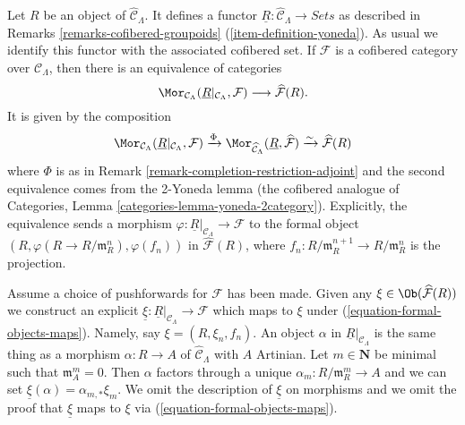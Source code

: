 \begin{remark}
\label{remark-formal-objects-yoneda}
Let $R$ be an object of $\widehat{\mathcal{C}}_\Lambda$.  It defines a functor
$\underline{R}: \widehat{\mathcal{C}}_\Lambda \to \textit{Sets}$
as described in
Remarks \ref{remarks-cofibered-groupoids} (\ref{item-definition-yoneda}).
As usual we identify this functor with the
associated cofibered set.  If $\mathcal{F}$ is a cofibered category over
$\mathcal{C}_\Lambda$, then there is an equivalence of categories
\begin{equation}
\label{equation-formal-objects-maps}
\Mor_{\mathcal{C}_\Lambda}(
\underline{R}|_{\mathcal{C}_\Lambda}, \mathcal{F})
\longrightarrow
\widehat{\mathcal{F}}(R).
\end{equation}
It is given by the composition
$$
\Mor_{\mathcal{C}_\Lambda}(
\underline{R}|_{\mathcal{C}_\Lambda}, \mathcal{F})
\xrightarrow{\Phi}
\Mor_{\widehat{\mathcal{C}}_\Lambda}(
\underline{R}, \widehat{\mathcal{F}})
\xrightarrow{\sim}
\widehat{\mathcal{F}}(R)
$$
where $\Phi$ is as in
Remark \ref{remark-completion-restriction-adjoint}
and the second equivalence comes from the 2-Yoneda lemma
(the cofibered analogue of
Categories, Lemma \ref{categories-lemma-yoneda-2category}).
Explicitly, the equivalence sends a morphism
$\varphi: \underline{R}|_{\mathcal{C}_\Lambda} \to \mathcal{F}$
to the formal object
$(R, \varphi(R \to R/\mathfrak{m}_R^n), \varphi(f_n))$ in
$\widehat{\mathcal{F}}(R)$, where
$f_n : R/\mathfrak m_R^{n + 1} \to R/\mathfrak m_R^n$ is the projection.

\medskip\noindent
Assume a choice of pushforwards for $\mathcal{F}$ has been made.
Given any $\xi \in \Ob(\widehat{\mathcal{F}}(R))$ we construct
an explicit
$\underline{\xi} : \underline{R}|_{\mathcal{C}_\Lambda} \to \mathcal{F}$
which maps to $\xi$ under (\ref{equation-formal-objects-maps}).
Namely, say $\xi = (R, \xi_n, f_n)$. An object $\alpha$ in
$\underline{R}|_{\mathcal{C}_\Lambda}$ is the same thing as a morphism
$\alpha : R \to A$ of $\widehat{\mathcal{C}}_\Lambda$ with $A$
Artinian. Let $m \in \mathbf{N}$ be minimal such that $\mathfrak m_A^m = 0$.
Then $\alpha$ factors through a unique $\alpha_m : R/\mathfrak m_R^m \to A$
and we can set $\underline{\xi}(\alpha) = \alpha_{m, *}\xi_m$.
We omit the description of $\underline{\xi}$ on morphisms and we
omit the proof that $\underline{\xi}$ maps to $\xi$
via (\ref{equation-formal-objects-maps}).


\end{remark}
